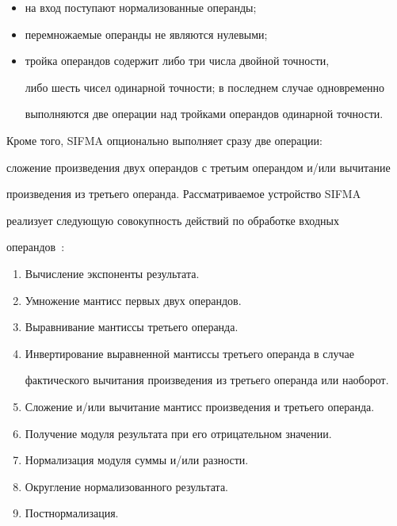       \begin{itemize}

      \item на вход поступают нормализованные операнды;

      \item перемножаемые операнды не являются нулевыми;

      \item тройка операндов содержит либо три числа двойной точности,

либо шесть чисел одинарной точности; в последнем случае одновременно

выполняются две операции над тройками операндов одинарной точности.

      \end{itemize}



      Кроме того, SIFMA опционально выполняет сразу две операции:

сложение произведения двух операндов с третьим операндом и/или вычитание

произведения из третьего операнда. Рассматриваемое устройство SIFMA

реализует следующую совокупность действий по обработке входных

операндов~\cite{7-st1}:

      \begin{enumerate}[1.]

\item  Вычисление экспоненты результата.

\item  Умножение мантисс первых двух операндов.

\item Выравнивание мантиссы третьего операнда.

\item  Инвертирование выравненной мантиссы третьего операнда в случае

фактического вычитания произведения из третьего операнда или наоборот.

\item Сложение и/или вычитание мантисс произведения и третьего операнда.

\item Получение модуля результата при его отрицательном значении.

\item Нормализация модуля суммы и/или разности.

\item Округление нормализованного результата.

\item  Постнормализация.

      \end{enumerate}




